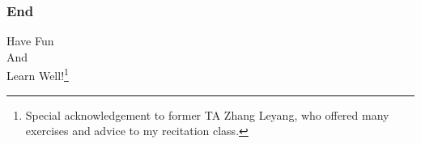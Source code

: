 \documentclass[10pt, t]{beamer}
\begin{document}
\begin{frame}
    \frametitle{End}
    \vspace{2.2cm}
    \begin{center}
        \Large
        Have Fun \\
        And \\
        Learn Well!\footnote[frame]{Special acknowledgement to former TA Zhang Leyang, who offered many exercises and advice to my recitation class.}
    \end{center}
\end{frame}
\end{document}
